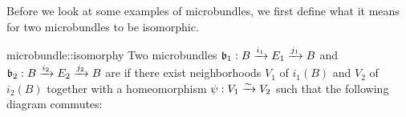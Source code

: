 \begin{myparagraph}
    Before we look at some examples of microbundles,
    we first define what it means for two microbundles to be isomorphic.
\end{myparagraph}

\begin{mydefinition}[isomorphy]{microbundle::isomorphy}{}
    Two microbundles $\bundledef{\bb_1}{B}{E_1}{i_1}{j_1}$ and $\bundledef{\bb_2}{B}{E_2}{i_2}{j_2}$
    are  if there exist neighborhoods $V_1$ of $i_1(B)$ and $V_2$ of $i_2(B)$
    together with a homeomorphism $\psi: V_1 \isomto V_2$
    such that the following diagram commutes: 
    \begin{center}
    \end{center}
\end{mydefinition}